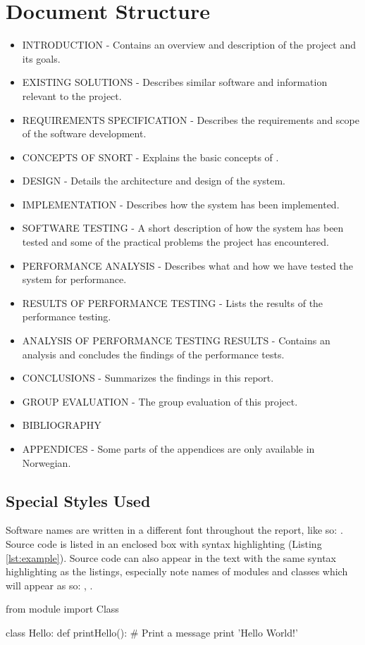 \section{Document Structure}
\begin{itemize}[]
\item INTRODUCTION - Contains an overview and description of the project and
its goals.
\item EXISTING SOLUTIONS - Describes similar software and information relevant
to the project.
\item REQUIREMENTS SPECIFICATION - Describes the requirements and scope of the
software development.
\item CONCEPTS OF SNORT - Explains the basic concepts of \snort{}.
\item DESIGN - Details the architecture and design of the system.
\item IMPLEMENTATION - Describes how the system has been implemented.
\item SOFTWARE TESTING - A short description of how the system has been tested
and some of the practical problems the project has encountered.
\item PERFORMANCE ANALYSIS - Describes what and how we have
tested the system for performance.
\item RESULTS OF PERFORMANCE TESTING - Lists the results of the performance
testing.
\item ANALYSIS OF PERFORMANCE TESTING RESULTS - Contains an analysis and
concludes the findings of the performance tests.
\item CONCLUSIONS - Summarizes the findings in this report.
\item GROUP EVALUATION - The group evaluation of this project.
\item BIBLIOGRAPHY
\item APPENDICES - Some parts of the appendices are only available in Norwegian.
\end{itemize}


\subsection{Special Styles Used}
Software names are written in a different font throughout the
report, like so: \snowman{}. Source code is listed in an enclosed box with
syntax highlighting (Listing \ref{lst:example}). Source code can also appear in
the text with the same syntax highlighting as the listings, especially note
names of modules and classes which will appear as so:
, .

\begin{python}[caption=Source code example.,label=lst:example]
from module import Class

class Hello:
  def printHello():
    # Print a message
    print 'Hello World!'
\end{python}